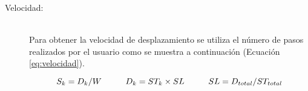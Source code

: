 \begin{description}
  \item[Velocidad:] \hfill \\
  	Para obtener la velocidad de desplazamiento se utiliza el número de pasos realizados por el usuario como se muestra a continuación (Ecuación \ref{eq:velocidad}).
  
\begin{equation} \label{eq:velocidad}
  S_{k} = D_{k}/W \hspace{10 mm} 
  D_{k} = ST_{k} \times SL \hspace{10 mm}
  SL = D_{total}/ST_{total} 
\end{equation}

\end{description}
	
\newpage

